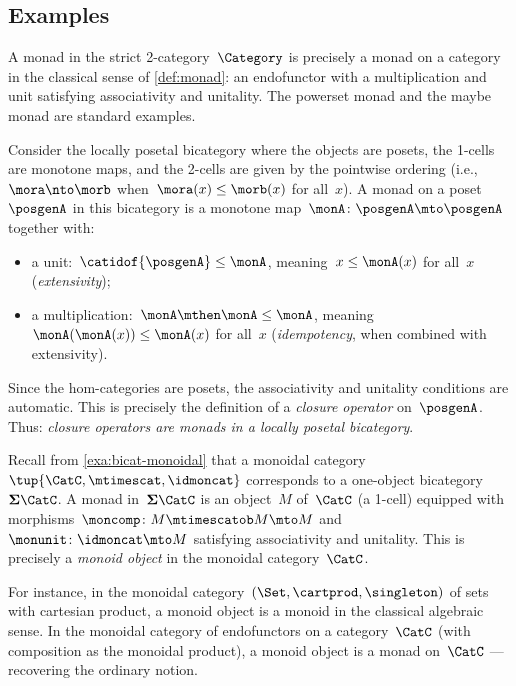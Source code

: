 \subsection{Examples}

\begin{example}
    \label{exa:bicat-monad-cat}
    A monad in the strict 2-category~$\Category$ is precisely a monad on a category in the classical sense of \cref{def:monad}: an endofunctor with a multiplication and unit satisfying associativity and unitality.
    The powerset monad and the maybe monad are standard examples.
\end{example}

\begin{example}
    \label{exa:bicat-monad-closure}
    Consider the locally posetal bicategory where the objects are posets, the 1-cells are monotone maps, and the 2-cells are given by the pointwise ordering (i.e., $\mora \nto \morb$ when~$\mora(x) \leq \morb(x)$ for all~$x$).
    A monad on a poset~$\posgenA$ in this bicategory is a monotone map~$\monA \colon \posgenA \mto \posgenA$ together with:
    \begin{itemize}
        \item a unit:~$\catidof{\posgenA} \leq \monA$, meaning~$x \leq \monA(x)$ for all~$x$ (\emph{extensivity});
        \item a multiplication:~$\monA \mthen \monA \leq \monA$, meaning~$\monA(\monA(x)) \leq \monA(x)$ for all~$x$ (\emph{idempotency}, when combined with extensivity).
    \end{itemize}
    Since the hom-categories are posets, the associativity and unitality conditions are automatic.
    This is precisely the definition of a \emph{closure operator} on~$\posgenA$.
    Thus: \emph{closure operators are monads in a locally posetal bicategory}.
\end{example}

\begin{example}
    \label{exa:bicat-monad-monoidal}
    Recall from \cref{exa:bicat-monoidal} that a monoidal category~$\tup{\CatC, \mtimescat, \idmoncat}$ corresponds to a one-object bicategory~$\mathbf{\Sigma}\CatC$.
    A monad in~$\mathbf{\Sigma}\CatC$ is an object~$M$ of~$\CatC$ (a 1-cell) equipped with morphisms~$\moncomp \colon M \mtimescatob M \mto M$ and~$\monunit \colon \idmoncat \mto M$ satisfying associativity and unitality.
    This is precisely a \emph{monoid object} in the monoidal category~$\CatC$.

    For instance, in the monoidal category~$(\Set, \cartprod, \singleton)$ of sets with cartesian product, a monoid object is a monoid in the classical algebraic sense.
    In the monoidal category of endofunctors on a category~$\CatC$ (with composition as the monoidal product), a monoid object is a monad on~$\CatC$ --- recovering the ordinary notion.
\end{example}

